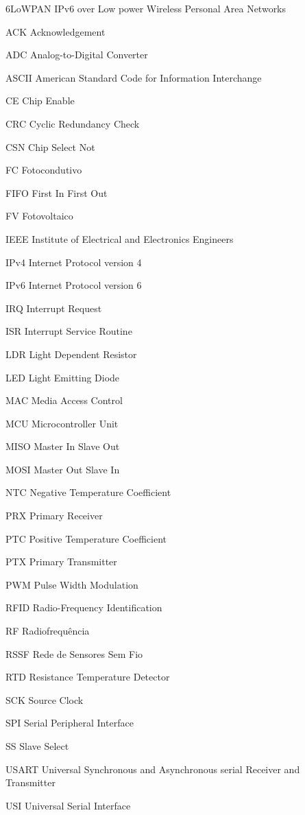 \begin{siglas}
\item [6LoWPAN] IPv6 over Low power Wireless Personal Area Networks
\item [ACK]	Acknowledgement
\item [ADC]	Analog-to-Digital Converter
\item [ASCII]	American Standard Code for Information Interchange
\item [CE]	Chip Enable
\item [CRC]	Cyclic Redundancy Check
\item [CSN]	Chip Select Not
\item [FC]	Fotocondutivo
\item [FIFO]	First In First Out
\item [FV]	Fotovoltaico
\item [IEEE]	Institute of Electrical and Electronics Engineers
\item [IPv4]	Internet Protocol version 4
\item [IPv6]	Internet Protocol version 6
\item [IRQ]	Interrupt Request
\item [ISR]	Interrupt Service Routine
\item [LDR]	Light Dependent Resistor
\item [LED]	Light Emitting Diode
\item [MAC]	Media Access Control
\item [MCU]	Microcontroller Unit
\item [MISO]	Master In Slave Out
\item [MOSI]	Master Out Slave In
\item [NTC]	Negative Temperature Coefficient
\item [PRX]	Primary Receiver
\item [PTC]	Positive Temperature Coefficient
\item [PTX]	Primary Transmitter
\item [PWM]	Pulse Width Modulation
\item [RFID]	Radio-Frequency Identification
\item [RF]	Radiofrequência
\item [RSSF]	Rede de Sensores Sem Fio
\item [RTD]	Resistance Temperature Detector
\item [SCK]	Source Clock
\item [SPI]	Serial Peripheral Interface
\item [SS]	Slave Select
\item [USART]	Universal Synchronous and Asynchronous serial Receiver and Transmitter
\item [USI]	Universal Serial Interface
\end{siglas}
